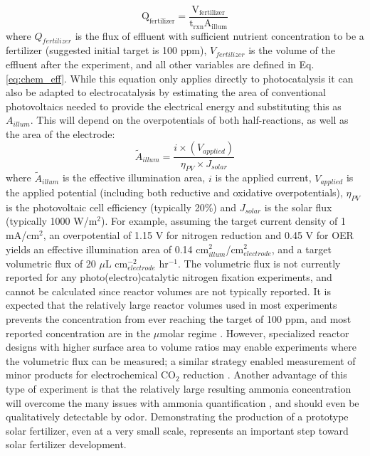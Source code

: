 \begin{equation}
\mathrm{
Q_{fertilizer} = \frac{V_{fertilizer}}{t_{rxn} A_{illum}}
}
\label{eq:flux}
\end{equation}
where $Q_{fertilizer}$ is the flux of effluent with sufficient nutrient concentration to be a fertilizer (suggested initial target is 100 ppm), $V_{fertilizer}$ is the volume of the effluent after the experiment, and all other variables are defined in Eq. \ref{eq:chem_eff}. While this equation only applies directly to photocatalysis it can also be adapted to electrocatalysis by estimating the area of conventional photovoltaics needed to provide the electrical energy and substituting this as $A_{illum}$. This will depend on the overpotentials of both half-reactions, as well as the area of the electrode:
\begin{equation}
    \tilde{A}_{illum} = \frac{i \times (V_{applied})}{\eta_{PV} \times J_{solar}}
\end{equation}
where $\tilde{A}_{illum}$ is the effective illumination area, $i$ is the applied current, $V_{applied}$ is the applied potential (including both reductive and oxidative overpotentials), $\eta_{PV}$ is the photovoltaic cell efficiency (typically 20\%) and $J_{solar}$ is the solar flux (typically 1000 W/m$^2$). For example, assuming the target current density of 1 mA/cm$^2$, an overpotential of 1.15 V for nitrogen reduction \cite{Song_2018} and 0.45 V for OER yields an effective illumination area of 0.14 cm$^2_{illum}$/cm$^2_{electrode}$, and a target volumetric flux of 20 $\mu$L cm$^{-2}_{electrode}$ hr$^{-1}$. The volumetric flux is not currently reported for any photo(electro)catalytic nitrogen fixation experiments, and cannot be calculated since reactor volumes are not typically reported. It is expected that the relatively large reactor volumes used in most experiments prevents the concentration from ever reaching the target of 100 ppm, and most reported concentration are in the $\mu$molar regime \cite{Hirakawa_2017,Medford_2017}. However, specialized reactor designs with higher surface area to volume ratios may enable experiments where the volumetric flux can be measured; a similar strategy enabled measurement of minor products for electrochemical CO$_2$ reduction \cite{Kuhl_2012}. Another advantage of this type of experiment is that the relatively large resulting ammonia concentration will overcome the many issues with ammonia quantification \cite{Greenlee_2018,Gao_2018,Zhao_2019,Cui_2018}, and should even be qualitatively detectable by odor. Demonstrating the production of a prototype solar fertilizer, even at a very small scale, represents an important step toward solar fertilizer development.

